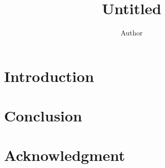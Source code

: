 

\title{Untitled}
\author{Author}

\maketitle
\begin{abstract}
\end{abstract}
\begin{keywords}
\end{keywords}
\section{Introduction}
\section{Conclusion}
\section*{Acknowledgment}

